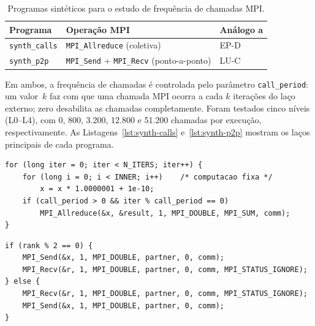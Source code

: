 \begin{table}[htb]
  \caption{Programas sintéticos para o estudo de frequência de chamadas MPI.}
  \label{tab:desc-calls}
  \centering
  \begin{tabular}{lll}
    \toprule
    Programa & Operação MPI & Análogo a \\
    \midrule
    \texttt{synth\_calls} & \texttt{MPI\_Allreduce} (coletiva)                       & EP-D \\
    \texttt{synth\_p2p}   & \texttt{MPI\_Send} + \texttt{MPI\_Recv} (ponto-a-ponto) & LU-C \\
    \bottomrule
  \end{tabular}
\end{table}

Em ambos, a frequência de chamadas é controlada pelo parâmetro \texttt{call\_period}:
um valor~$k$ faz com que uma chamada MPI ocorra a cada $k$ iterações do laço externo;
zero desabilita as chamadas completamente. Foram testados cinco níveis (L0--L4), com
0, 800, 3.200, 12.800 e 51.200 chamadas por execução, respectivamente. As
Listagens~\ref{lst:synth-calls} e~\ref{lst:synth-p2p} mostram os laços principais de
cada programa.

\begin{listing}[htb]
  \caption{\texttt{synth\_calls}: laço com \texttt{MPI\_Allreduce} em frequência variável.}
  \label{lst:synth-calls}
  \begin{verbatim}
for (long iter = 0; iter < N_ITERS; iter++) {
    for (long i = 0; i < INNER; i++)    /* computacao fixa */
        x = x * 1.0000001 + 1e-10;
    if (call_period > 0 && iter % call_period == 0)
        MPI_Allreduce(&x, &result, 1, MPI_DOUBLE, MPI_SUM, comm);
}
  \end{verbatim}
\end{listing}

\begin{listing}[htb]
  \caption{\texttt{synth\_p2p}: troca ponto-a-ponto em frequência variável.}
  \label{lst:synth-p2p}
  \begin{verbatim}
if (rank % 2 == 0) {
    MPI_Send(&x, 1, MPI_DOUBLE, partner, 0, comm);
    MPI_Recv(&r, 1, MPI_DOUBLE, partner, 0, comm, MPI_STATUS_IGNORE);
} else {
    MPI_Recv(&r, 1, MPI_DOUBLE, partner, 0, comm, MPI_STATUS_IGNORE);
    MPI_Send(&x, 1, MPI_DOUBLE, partner, 0, comm);
}
  \end{verbatim}
\end{listing}

